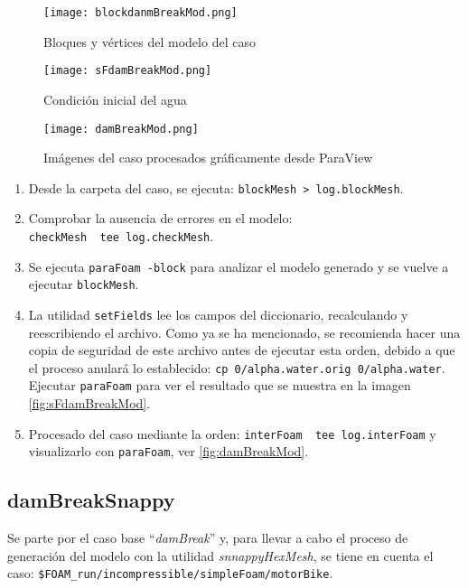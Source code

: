 \begin{figure}
\centering
\texttt{[image: blockdanmBreakMod.png]}
\caption{Bloques y vértices del modelo del caso}
\label{fig:blockdanmBreakMod}
\end{figure}

\begin{figure}
\centering
\texttt{[image: sFdamBreakMod.png]}
\caption{Condición inicial del agua}
\label{fig:sFdamBreakMod}
\end{figure}

\begin{figure}
\centering
\texttt{[image: damBreakMod.png]}
\caption{Imágenes del caso procesados gráficamente desde ParaView}
\label{fig:damBreakMod}
\end{figure}

\begin{enumerate}
\def\labelenumi{\arabic{enumi}.}
\item
  Desde la carpeta del caso, se ejecuta:
  \texttt{blockMesh\ \textgreater{}\ log.blockMesh}.
\item
  Comprobar la ausencia de errores en el modelo:
  \texttt{checkMesh\ \textbar{}\ tee\ log.checkMesh}.
\item
  Se ejecuta \texttt{paraFoam\ -block} para analizar el modelo generado
  y se vuelve a ejecutar \texttt{blockMesh}.
\item
  La utilidad \texttt{setFields} lee los campos del diccionario,
  recalculando y reescribiendo el archivo. Como ya se ha mencionado, se
  recomienda hacer una copia de seguridad de este archivo antes de
  ejecutar esta orden, debido a que el proceso anulará lo establecido:
  \texttt{cp\ 0/alpha.water.orig\ 0/alpha.water}. Ejecutar
  \texttt{paraFoam} para ver el resultado que se muestra en la imagen \autoref{fig:sFdamBreakMod}.


\item
  Procesado del caso mediante la orden:
  \texttt{interFoam\ \textbar{}\ tee\ log.interFoam} y visualizarlo con
  \texttt{paraFoam}, ver \autoref{fig:damBreakMod}.

\end{enumerate}

\subsection{damBreakSnappy}\label{header-n850}

Se parte por el caso base ``\emph{damBreak}'' y, para llevar a cabo el
proceso de generación del modelo con la utilidad \emph{snnappyHexMesh},
se tiene en cuenta el caso: \lstinline[style=bash]{$FOAM_run/incompressible/simpleFoam/motorBike}.

